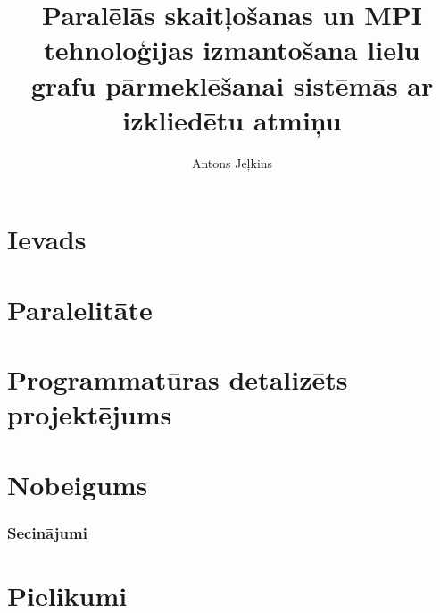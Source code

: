 \documentclass[master-thesis]{rtu-thesis}
\title{Paralēlās skaitļošanas un MPI tehnoloģijas izmantošana lielu
       grafu pārmeklēšanai sistēmās ar izkliedētu atmiņu}
\author{Antons Jeļkins}
\begin{document}
\frontmatter
\maketitle
\tableofcontents


\mainmatter
\part{Ievads}


\part{Paralelitāte}













\part{Programmatūras detalizēts projektējums}







\part{Nobeigums}
\section{Secinājumi}

\listoffigures
\listoftables
\listofalgorithms



\part{Pielikumi}\appendix



\end{document}
